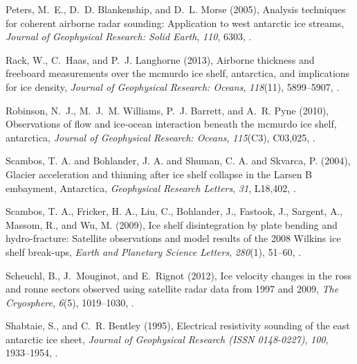 \documentclass[draft,grl]{agutex}
\begin{document}
\begin{article}
\begin{thebibliography}{40}
Peters, M.~E., D.~D. Blankenship, and D.~L. Morse (2005), Analysis techniques
  for coherent airborne radar sounding: Application to west antarctic ice
  streams, \textit{Journal of Geophysical Research: Solid Earth}, \textit{110},
  6303, .

Rack, W., C.~Haas, and P.~J. Langhorne (2013), Airborne thickness and freeboard
  measurements over the mcmurdo ice shelf, antarctica, and implications for ice
  density, \textit{Journal of Geophysical Research: Oceans}, \textit{118}(11),
  5899--5907, .

Robinson, N.~J., M.~J.~M. Williams, P.~J. Barrett, and A.~R. Pyne (2010),
  Observations of flow and ice-ocean interaction beneath the mcmurdo ice shelf,
  antarctica, \textit{Journal of Geophysical Research: Oceans},
  \textit{115}(C3), C03,025, .

{Scambos, T. A. and Bohlander, J. A. and Shuman, C. A. and Skvarca, P.}
  ({2004}), {Glacier acceleration and thinning after ice shelf collapse in the
  Larsen B embayment, Antarctica}, \textit{{Geophysical Research Letters}},
  \textit{{31}}, {L18,402}, .
  
{Scambos, T. A., Fricker, H. A., Liu, C., Bohlander, J., Fastook, J., Sargent, A., Massom, R., and Wu, M.} ({2009}), {Ice shelf disintegration by plate bending and hydro-fracture: Satellite observations and model results of the 2008 Wilkins ice shelf break-ups}, \textit{{Earth and Planetary Science Letters}}, \textit{280}(1), 51--60, .

Scheuchl, B., J.~Mouginot, and E.~Rignot (2012), Ice velocity changes in the
  ross and ronne sectors observed using satellite radar data from 1997 and
  2009, \textit{The Cryosphere}, \textit{6}(5), 1019--1030,
  .

Shabtaie, S., and C.~R. Bentley (1995), Electrical resistivity sounding of the
  east antarctic ice sheet, \textit{Journal of Geophysical Research (ISSN
  0148-0227)}, \textit{100}, 1933--1954, .


\end{thebibliography}
\end{article}
\end{document}
